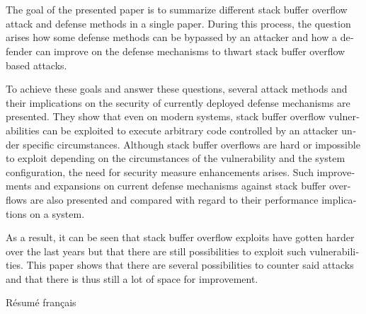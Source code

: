 \newenvironment{abstractpage}
  {\cleardoublepage\thispagestyle{empty}\chapter*{\abstractname}}
  {\cleardoublepage}
\renewenvironment{abstract}[1]
  {\bigskip\begin{otherlanguage}{#1}%
   \begin{center}\bfseries\abstractname\end{center}\noindent}
  {\end{otherlanguage}\par\bigskip}

\begin{abstractpage}
  \begin{abstract}{american}
    The goal of the presented paper is to summarize different stack buffer overflow attack and defense methods in a single paper.
    During this process, the question arises how some defense methods can be bypassed by an attacker and how a defender can improve on the defense mechanisms to thwart stack buffer overflow based attacks.

    To achieve these goals and answer these questions, several attack methods and their implications on the security of currently deployed defense mechanisms are presented.
    They show that even on modern systems, stack buffer overflow vulnerabilities can be exploited to execute arbitrary code controlled by an attacker under specific circumstances.
    Although stack buffer overflows are hard or impossible to exploit depending on the circumstances of the vulnerability and the system configuration, the need for security measure enhancements arises.
    Such improvements and expansions on current defense mechanisms against stack buffer overflows are also presented and compared with regard to their performance implications on a system.

    As a result, it can be seen that stack buffer overflow exploits have gotten harder over the last years but that there are still possibilities to exploit such vulnerabilities.
    This paper shows that there are several possibilities to counter said attacks and that there is thus still a lot of space for improvement.
  \end{abstract}
  \vspace{2em}
  \begin{abstract}{french}
    Résumé français
  \end{abstract}
\end{abstractpage}

